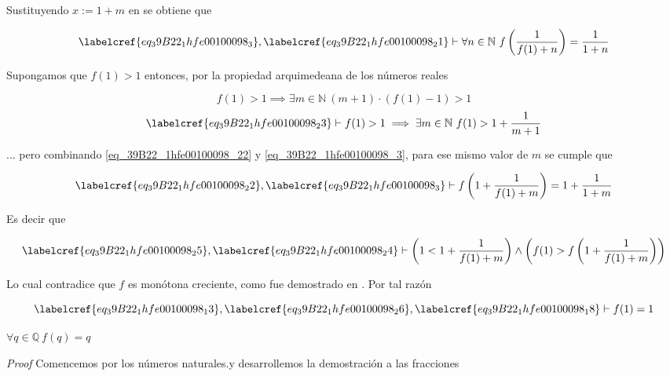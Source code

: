 Sustituyendo $x := 1 + m$ en  se obtiene que

\begin{equation} \label{eq_39B22_1hfe00100098_22}
	\labelcref{eq_39B22_1hfe00100098_3}, \labelcref{eq_39B22_1hfe00100098_21} \vdash \forall n \in \mathbb{N}\ f\left(\frac{1}{f(1) + n}\right) = \frac{1}{1 + n}
\end{equation}

Supongamos que $f(1) > 1$ entonces, por la propiedad arquimedeana de los números reales

\begin{equation} \label{eq_39B22_1hfe00100098_23}
	 f(1) > 1 \implies \exists m \in \mathbb{N}\ (m+1) \cdot (f(1) - 1) > 1
\end{equation}
\begin{equation} \label{eq_39B22_1hfe00100098_24}
	\labelcref{eq_39B22_1hfe00100098_23} \vdash f(1) > 1 \implies \exists m \in \mathbb{N}\ f(1) > 1 + \frac{1}{m+1}
\end{equation}

... pero combinando \cref{eq_39B22_1hfe00100098_22} y \cref{eq_39B22_1hfe00100098_3}, para ese mismo valor de $m$ se cumple que

\begin{equation} \label{eq_39B22_1hfe00100098_25}
	\labelcref{eq_39B22_1hfe00100098_22}, \labelcref{eq_39B22_1hfe00100098_3} \vdash f\left(1 + \frac{1}{f(1) + m}\right) = 1 + \frac{1}{1+m}
\end{equation}

Es decir que 

\begin{equation} \label{eq_39B22_1hfe00100098_26}
	\labelcref{eq_39B22_1hfe00100098_25}, \labelcref{eq_39B22_1hfe00100098_24} \vdash \left(1 < 1 + \frac{1}{f(1) + m}\right) \land \left(f(1) > f\left(1 + \frac{1}{f(1) + m}\right)\right)
\end{equation}

Lo cual contradice que $f$ es monótona creciente, como fue demostrado en  . Por tal razón 

\begin{equation} \label{eq_39B22_1hfe00100098_27}
	\labelcref{eq_39B22_1hfe00100098_13}, \labelcref{eq_39B22_1hfe00100098_26}, \labelcref{eq_39B22_1hfe00100098_18} \vdash f(1) = 1
\end{equation}

\begin{claim}
	$\forall q \in \mathbb{Q}\ f(q) = q$
\end{claim}
\textit{Proof} Comencemos por los números naturales.y desarrollemos la demostración a las fracciones

